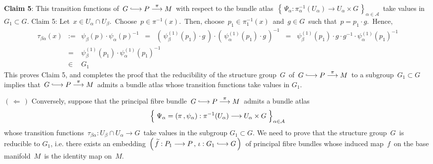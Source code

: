 \vskip 0.5cm
\noindent
\textbf{Claim 5}:\quad
This transition functions of
\,$G \longhookrightarrow P \overset{\pi}{\longrightarrow} M$\,
with respect to the bundle atlas
\,$\left\{\,\Psi_{\alpha} : \pi_{\alpha}^{-1}(U_{\alpha}) \longrightarrow U_{\alpha} \times G\,\right\}_{\alpha\in\mathcal{A}}$\,
take values in \,$G_{1} \subset G$.
\vskip 0.2cm
\proofof Claim 5:\quad
Let \,$x \in U_{\alpha} \cap U_{\beta}$.\,
Choose \,$p \in \pi^{-1}(x)$.\,
Then, choose \,$p_{1} \in \pi_{1}^{-1}(x)$\, and \,$g \in G$\, such that \,$p = p_{1} \cdot g$.\,
Hence,
\begin{eqnarray*}
\tau_{\beta\alpha}(x)
& := &
	\psi_{\beta}(p) \cdot \psi_{\alpha}(p)^{-1}
\;\; = \;\;
	\left(\,\psi_{\beta}^{(1)}(p_{1}) \cdot g\,\right) \cdot \left(\,\psi_{\alpha}^{(1)}(p_{1}) \cdot g\,\right)^{-1}	
\;\; = \;\;
	\psi_{\beta}^{(1)}(p_{1}) \cdot g \cdot g^{-1} \cdot \psi_{\alpha}^{(1)}(p_{1})^{-1}	
\\
& = &
	\psi_{\beta}^{(1)}(p_{1}) \cdot \psi_{\alpha}^{(1)}(p_{1})^{-1}	
\\
& \in &
	G_{1}
\end{eqnarray*}
This proves Claim 5, and completes the proof that
the reducibility of the structure group \,$G$\, of
\,$G \longhookrightarrow P \overset{\pi}{\longrightarrow} M$\,
to a subgroup \,$G_{1} \subset G$\, implies that
\,$G \longhookrightarrow P \overset{\pi}{\longrightarrow} M$\,
admits a bundle atlas whose transition functions take values in $G_{1}$.

\vskip 0.8cm
\noindent
\underline{$(\,\Longleftarrow\,)$}\;\;
Conversely, suppose that the principal fibre bundle
\,$G \longhookrightarrow P \overset{\pi}{\longrightarrow} M$\,
admits a bundle atlas
\begin{equation*}
\left\{\;\Psi_{\alpha} = (\pi\,,\psi_{\alpha}) : \pi^{-1}(U_{\alpha}) \overset{{\color{white}1}}{\longrightarrow} U_{\alpha} \times G\;\right\}_{\alpha\in\mathcal{A}}
\end{equation*}
whose transition functions
\,$\tau_{\beta\alpha} : U_{\beta} \cap U_{\alpha} \longrightarrow G$\,
take values in the subgroup $G_{1} \subset G$.
We need to prove that the structure group \,$G$\, is reducible to $G_{1}$, i.e. there exists an embedding
\,$\left(\,\widetilde{f} : P_{1} \longrightarrow P \,,\, \iota : G_{1} \longhookrightarrow G\,\right)$\,
of principal fibre bundles
whose induced map \,$f$\, on the base manifold \,$M$\, is the identity map on \,$M$.\,

